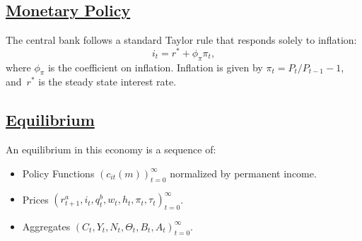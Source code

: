 \documentclass[\PathToRoot/\ProjectName]{subfiles}
\begin{document}
\subsection{\href{https://econ-ark.github.io/HAFiscal/\#sec:hank-monetary-policy}{Monetary Policy}}\label{sec:hank-monetary-policy}

The central bank follows a standard Taylor rule that responds solely to inflation:
\[
  i_{t} = r^{*} +\phi_{\pi} \pi_{t},
\]
where $\phi_{\pi}$ is the coefficient on inflation. Inflation is given by $\pi_t = P_t/P_{t-1}-1$, and~$r^{*}$ is the steady state interest rate.

\subsection{\href{https://econ-ark.github.io/HAFiscal/\#sec:hank-equilibrium}{Equilibrium}}\label{sec:hank-equilibrium}

An equilibrium in this economy is a sequence of:
\begin{itemize}[label=--]
  \item
        Policy Functions $\left( c_{it}(m) \right )_{t=0}^{\infty}$ normalized by permanent income.
  \item
        Prices $ \left( r^{a}_{t+1}, i_{t}, q^{b}_{t},  w_{t}, h_{t} , \pi_{t} , \tau_{t} \right) _{t=0}^{\infty}$.
  \item
        Aggregates $ \left(C_{t}, Y_{t} , N_{t},   \Theta_{t},  B_{t} , A_{t}  \right)_{t=0}^{\infty}$.
\end{itemize}
\end{document}

